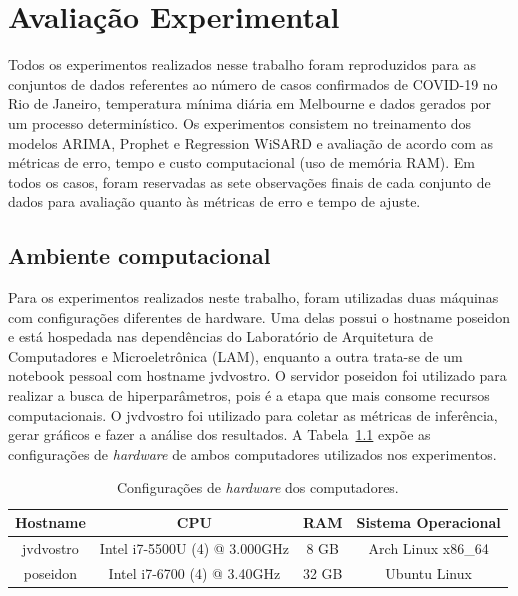 \chapter{Avaliação Experimental}\label{chap:05}

Todos os experimentos realizados nesse trabalho foram reproduzidos para as conjuntos de dados referentes ao número de casos confirmados de COVID-19 no Rio de Janeiro, temperatura mínima diária em Melbourne e dados gerados por um processo determinístico. Os experimentos consistem no treinamento dos modelos ARIMA, Prophet e Regression WiSARD e avaliação de acordo com as métricas de erro, tempo e custo computacional (uso de memória RAM). Em todos os casos, foram reservadas as sete observações finais de cada conjunto de dados para avaliação quanto às métricas de erro e tempo de ajuste.

\section{Ambiente computacional}
Para os experimentos realizados neste trabalho, foram utilizadas duas máquinas com configurações diferentes de hardware. Uma delas possui o hostname poseidon e está hospedada nas dependências do Laboratório de Arquitetura de Computadores e Microeletrônica (LAM), enquanto a outra trata-se de um notebook pessoal com hostname jvdvostro. O servidor poseidon foi utilizado para realizar a busca de hiperparâmetros, pois é a etapa que mais consome recursos computacionais. O jvdvostro foi utilizado para coletar as métricas de inferência, gerar gráficos e fazer a análise dos resultados. A Tabela~\ref{tab:hardware} expõe as configurações de \textit{hardware} de ambos computadores utilizados nos experimentos.

\begin{table}[!htp]
    \caption{Configurações de \textit{hardware} dos computadores.}\label{tab:hardware}
    \centering
    \begin{tabular}{@{}cccc@{}}\toprule
        Hostname  & CPU                           & RAM   & Sistema Operacional \\ \midrule
        jvdvostro & Intel i7-5500U (4) @ 3.000GHz & 8 GB  & Arch Linux x86\_64  \\
        poseidon  & Intel i7-6700 (4) @ 3.40GHz   & 32 GB & Ubuntu Linux        \\ \bottomrule
    \end{tabular}
\end{table}

